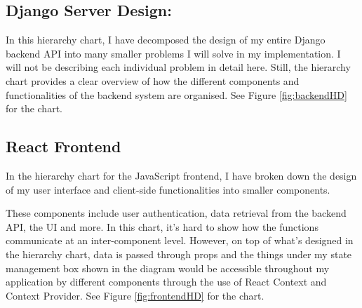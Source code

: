\subsection{Django Server Design:}
In this hierarchy chart, I have decomposed the design of my entire Django backend API into many smaller problems I will solve in my implementation. I will not be describing each individual problem in detail here. Still, the hierarchy chart provides a clear overview of how the different components and functionalities of the backend system are organised. See Figure \ref{fig:backendHD} for the chart.

\subsection{React Frontend}
In the hierarchy chart for the JavaScript frontend, I have broken down the design of my user interface and client-side functionalities into smaller components.

These components include user authentication, data retrieval from the backend API, the UI and more. In this chart, it's hard to show how the functions communicate at an inter-component level. However, on top of what's designed in the hierarchy chart, data is passed through props and the things under my state management box shown in the diagram would be accessible throughout my application by different components through the use of React Context and Context Provider. See Figure \ref{fig:frontendHD} for the chart.




